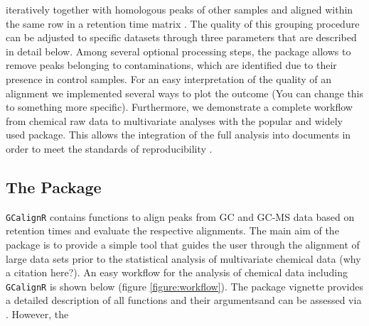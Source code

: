 iteratively together with homologous peaks of other samples and aligned
within the same row in a retention time matrix . The quality of this
grouping procedure can be adjusted to specific datasets through three
parameters that are described in detail below. Among several optional
processing steps, the package allows to remove peaks belonging to
contaminations, which are identified due to their presence in control
samples. For an easy interpretation of the quality of an alignment we
implemented several ways to plot the outcome (You can change this to
something more specific). Furthermore, we demonstrate a complete
workflow from chemical raw data to multivariate analyses with the
popular and widely used
\href{https://cran.r-project.org/web/packages/vegan/index.html}{}
\citep{Oksanen.2016} package. This allows the integration of the full
analysis into  documents \citep{Allaire.2016} in order
to meet the standards of reproducibility \citep{Peng.2011}.

\subsection{The Package}\label{the-package}

\texttt{GCalignR} contains functions to align peaks from GC and GC-MS
data based on retention times and evaluate the respective alignments.
The main aim of the package is to provide a simple tool that guides the
user through the alignment of large data sets prior to the statistical
analysis of multivariate chemical data \citep{Anderson.2001} (why a
citation here?). An easy workflow for the analysis of chemical data
including \texttt{GCalignR} is shown below (figure
\ref{figure:workflow}). The package vignette provides a detailed
description of all functions and their argumentsand can be assessed via
. However, the

